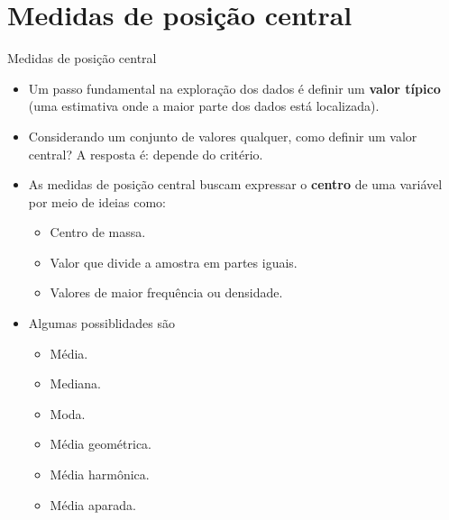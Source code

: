 \documentclass[
  ignorenonframetext,
  serif,
  professionalfont,
  usenames,
  dvipsnames,
  aspectratio = 169]{beamer}
\providecommand{\tightlist}{%
  \setlength{\itemsep}{0pt}\setlength{\parskip}{0pt}}
\renewcommand{\tightlist}{%
  \setlength{\itemsep}{0\baselineskip}
  \setlength{\parskip}{0.25\baselineskip}
}
\def\beginAHalfColumn{\begin{minipage}{0.49\textwidth}}%
\def\endColumns{\end{minipage}}%
\begin{document}
\section{Medidas de posição
central}\label{medidas-de-posiuxe7uxe3o-central}

\begin{frame}{Medidas de posição central}
\label{medidas-de-posiuxe7uxe3o-central-1}
\begin{itemize}
\item
  Um passo fundamental na exploração dos dados é definir um
  \textbf{valor típico} (uma estimativa onde a maior parte dos dados
  está localizada).
\item
  Considerando um conjunto de valores qualquer, como definir um valor
  central? A resposta é: depende do critério.
\end{itemize}

\vspace{0.7cm}

\beginAHalfColumn

\begin{itemize}
\tightlist
\item
  As medidas de posição central buscam expressar o \textbf{centro} de
  uma variável por meio de ideias como:

  \begin{itemize}
  \tightlist
  \item
    Centro de massa.
  \item
    Valor que divide a amostra em partes iguais.
  \item
    Valores de maior frequência ou densidade.
  \end{itemize}
\end{itemize}

\endColumns
\beginAHalfColumn

\begin{itemize}
\tightlist
\item
  Algumas possiblidades são

  \begin{itemize}
  \tightlist
  \item
    Média.
  \item
    Mediana.
  \item
    Moda.
  \item
    Média geométrica.
  \item
    Média harmônica.
  \item
    Média aparada.
  \end{itemize}
\end{itemize}

\endColumns
\end{frame}
\end{document}
